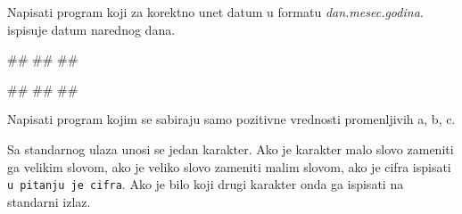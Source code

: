 \begin{Exercise}[label=p1.2_] 
 Napisati program koji za korektno unet datum u formatu \textit{dan.mesec.godina.} ispisuje datum narednog dana.\\
\begin{miditest}
\begin{upotreba}{1}
#\naslovInt#
##
##
\end{upotreba}
\end{miditest}
\begin{miditest}
\begin{upotreba}{2}
#\naslovInt#
##
##
\end{upotreba}
\end{miditest}
\end{Exercise}
\begin{Answer}[ref=p1.2_]
\end{Answer}

\begin{Exercise}[label=p1.3_] 
Napisati program kojim se sabiraju samo pozitivne vrednosti
promenljivih a, b, c.  
\end{Exercise}
\begin{Answer}[ref=p1.3_]
\end{Answer}

\begin{Exercise}[label=p1.4_] 
Sa standarnog ulaza unosi se jedan karakter. Ako je karakter malo
slovo zameniti ga velikim slovom, ako je veliko slovo zameniti malim
slovom, ako je cifra ispisati \verb|u pitanju je cifra|. Ako je bilo
koji drugi karakter onda ga ispisati na standarni izlaz.
\end{Exercise}
\begin{Answer}[ref=p1.4_]
\end{Answer}

